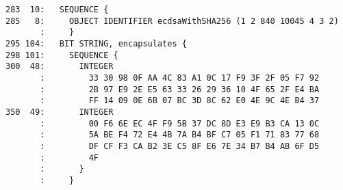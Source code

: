 \documentclass[12pt]{article}
\begin{document}
\begin{verbatim}
283  10:   SEQUENCE {
285   8:     OBJECT IDENTIFIER ecdsaWithSHA256 (1 2 840 10045 4 3 2)
       :     }
295 104:   BIT STRING, encapsulates {
298 101:     SEQUENCE {
300  48:       INTEGER
       :         33 30 98 0F AA 4C 83 A1 0C 17 F9 3F 2F 05 F7 92
       :         2B 97 E9 2E E5 63 33 26 29 36 10 4F 65 2F E4 BA
       :         FF 14 09 0E 6B 07 BC 3D 8C 62 E0 4E 9C 4E B4 37
350  49:       INTEGER
       :         00 F6 6E EC 4F F9 5B 37 DC 8D E3 E9 B3 CA 13 0C
       :         5A BE F4 72 E4 4B 7A B4 BF C7 05 F1 71 83 77 68
       :         DF CF F3 CA B2 3E C5 8F E6 7E 34 B7 B4 AB 6F D5
       :         4F
       :       }
       :     }
\end{verbatim}
\end{document}
